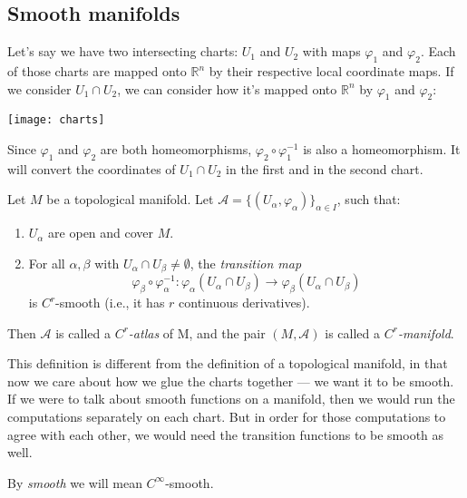 \subsection{Smooth manifolds}

Let's say we have two intersecting charts: $U_1$ and $U_2$
with maps $\varphi_1$ and $\varphi_2$.
Each of those charts are mapped onto $\mathbb{R}^n$ by their respective local
coordinate maps.
If we consider $U_1 \cap U_2$, we can consider how it's mapped onto $\mathbb{R}^n$
by $\varphi_1$ and $\varphi_2$:

\begin{figure*}[h]
    \centering
    \texttt{[image: charts]}
\end{figure*}

Since $\varphi_1$ and $\varphi_2$ are both homeomorphisms,
$\varphi_2 \circ \varphi_1^{-1}$ is also a homeomorphism. It will
convert the coordinates of $U_1 \cap U_2$ in the first and in the second chart.

\begin{samepage}
\begin{definition}
    Let $M$ be a topological manifold. 
    Let $\mathcal{A} = \{(U_\alpha, \varphi_\alpha)\}_{\alpha \in I}$, such that:
    \begin{enumerate}
        \item {
            $U_\alpha$ are open and cover $M$.
        }
        \item {
            For all $\alpha, \beta$ with $U_\alpha \cap U_\beta \ne \emptyset$,
            the \textit{transition map}
            \[ 
                \varphi_\beta \circ \varphi_\alpha^{-1} :
                \varphi_\alpha(U_\alpha \cap U_\beta) \to \varphi_\beta(U_\alpha \cap U_\beta)
            \]
            is $C^r$-smooth (i.e., it has $r$ continuous derivatives).
        }
    \end{enumerate}
    Then $\mathcal{A}$ is called a \textit{$C^r$-atlas} of M,
    and the pair $(M, \mathcal{A})$ is called a \textit{$C^r$-manifold}.
\end{definition}
\end{samepage}
\begin{remark}
    This definition is different from the definition of a topological manifold,
    in that now we care about how we glue the charts together --- we want
    it to be smooth.
    If we were to talk about smooth functions on a manifold, then 
    we would run the computations separately on each chart. But in order for 
    those computations to agree with each other, we would need the transition
    functions to be smooth as well.
\end{remark}
\begin{remark}
    By \textit{smooth}  we will mean $C^\infty$-smooth.
\end{remark}

